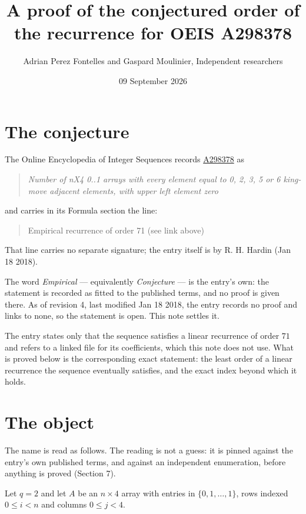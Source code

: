 \documentclass[11pt]{article}
\title{A proof of the conjectured order of the recurrence for OEIS A298378}
\author{Adrian Perez Fontelles and Gaspard Moulinier, Independent researchers}
\date{09 September 2026}
\theoremstyle{definition}
\begin{document}
\maketitle
\section{The conjecture}

The Online Encyclopedia of Integer Sequences records \href{https://oeis.org/A298378}{A298378} as

\begin{quote}\itshape Number of nX4 0..1 arrays with every element equal to 0, 2, 3, 5 or 6 king-move adjacent elements, with upper left element zero\end{quote}

and carries in its Formula section the line:

\begin{quote}\ttfamily Empirical recurrence of order 71 (see link above)\end{quote}

That line carries no separate signature; the entry itself is by R. H. Hardin (Jan 18 2018).

The word {\itshape Empirical} --- equivalently {\itshape Conjecture} --- is the entry's own: the statement is recorded as fitted to the published terms, and no proof is given there. As of revision 4, last modified Jan 18 2018, the entry records no proof and links to none, so the statement is open. This note settles it.

The entry states only that the sequence satisfies a linear recurrence of order $71$ and refers to a linked file for its coefficients, which this note does not use. What is proved below is the corresponding exact statement: the least order of a linear recurrence the sequence eventually satisfies, and the exact index beyond which it holds.

\section{The object}

The name is read as follows. The reading is not a guess: it is pinned against the entry's own published terms, and against an independent enumeration, before anything is proved (Section 7).

Let $q = 2$ and let $A$ be an $n \times 4$ array with entries in $\{0,1,\dots,1\}$, rows indexed $0 \le i < n$ and columns $0 \le j < 4$.
\end{document}
